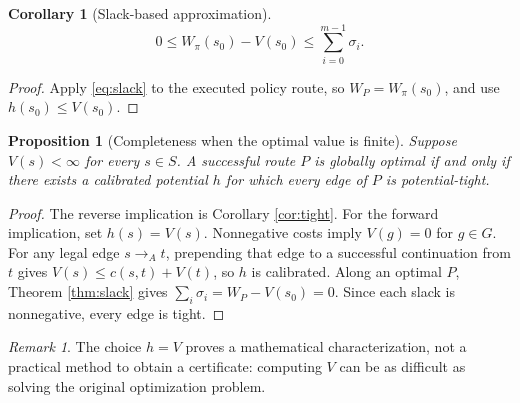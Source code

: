 \documentclass[11pt,letterpaper]{article}
\newtheorem{proposition}[theorem]{Proposition}
\newtheorem{corollary}[theorem]{Corollary}
\theoremstyle{definition}\newtheorem{definition}[theorem]{Definition}\newtheorem{example}[theorem]{Example}
\theoremstyle{remark}\newtheorem{remark}[theorem]{Remark}
\begin{document}
\begin{corollary}[Slack-based approximation]
\[
0\le W_\pi(s_0)-V(s_0)\le \sum_{i=0}^{m-1}\sigma_i.
\]
\end{corollary}
\begin{proof}
Apply \eqref{eq:slack} to the executed policy route, so $W_P=W_\pi(s_0)$, and use $h(s_0)\le V(s_0)$.
\end{proof}
\begin{proposition}[Completeness when the optimal value is finite]\label{prop:completeness}
Suppose $V(s)<\infty$ for every $s\in S$. A successful route $P$ is globally optimal if and only if there exists a calibrated potential $h$ for which every edge of $P$ is potential-tight.
\end{proposition}
\begin{proof}
The reverse implication is Corollary \ref{cor:tight}. For the forward implication, set $h(s)=V(s)$. Nonnegative costs imply $V(g)=0$ for $g\in G$. For any legal edge $s\to_A t$, prepending that edge to a successful continuation from $t$ gives $V(s)\le c(s,t)+V(t)$, so $h$ is calibrated. Along an optimal $P$, Theorem \ref{thm:slack} gives $\sum_i\sigma_i=W_P-V(s_0)=0$. Since each slack is nonnegative, every edge is tight.
\end{proof}
\begin{remark}
The choice $h=V$ proves a mathematical characterization, not a practical method to obtain a certificate: computing $V$ can be as difficult as solving the original optimization problem.
\end{remark}
\end{document}
